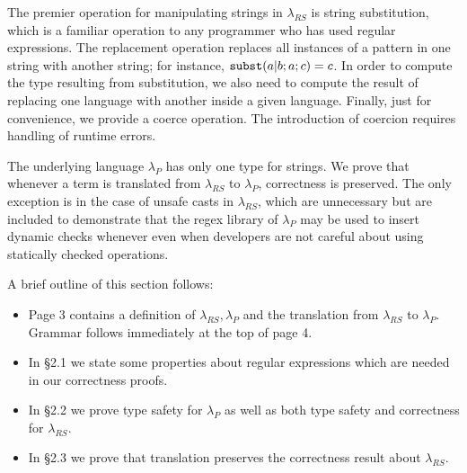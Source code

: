\documentclass[9pt]{sig-alternate}
\theoremstyle{definition}
\newcommand{\lambdas}{\lambda_{RS}}
\newcommand{\lambdap}{\lambda_P}
\newcommand{\lsubst}[3]{{\tt subst}(#1;#2;#3)} %
\begin{document}
The premier operation for manipulating strings in $\lambdas$ is string substitution, 
which is a familiar operation to any programmer who has used regular expressions.
The replacement operation replaces all instances of a pattern in one string with
another string; for instance, $\lsubst{a|b}{a}{c} = c$.
In order to compute the type resulting from substitution, we also need to compute
the result of replacing one language with another inside a given language.
Finally, just for convenience, we provide a coerce operation. The introduction of
coercion requires handling of runtime errors.

The underlying language $\lambdap$ has only one type for strings. We prove that whenever
a term is translated from $\lambdas$ to $\lambdap$, correctness is preserved.
The only exception is in the case of unsafe casts in $\lambdas$, which are unnecessary but
are included to demonstrate that the regex library of $\lambdap$ may be used to insert
dynamic checks whenever even when developers are not careful about using statically checked
operations.

A brief outline of this section follows:
\begin{itemize}
  \item Page 3 contains a definition of $\lambdas, \lambdap$ and the translation from $\lambdas$ to $\lambdap$. Grammar follows immediately at the top of page 4.
  \item In \S 2.1 we state some properties about regular expressions which are needed in our correctness proofs.
   \item In \S 2.2 we prove type safety for $\lambdap$ as well as both type safety and correctness for $\lambdas$.
  \item In \S 2.3 we prove that translation preserves the correctness result about $\lambdas$.
\end{itemize}
\end{document}
